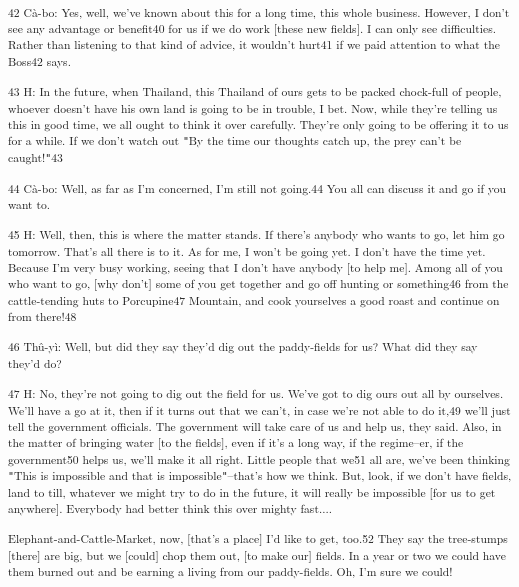 {\textsuperscript{42 Cà-bo: Yes, well, we've known about this for a long
time, this whole business. However, I don't see any advantage or benefit40 for
us if we do work [these new fields]. I can only see difficulties. Rather than listening
to that kind of advice, it wouldn't hurt41 if we paid attention to what the Boss42
says. }}

{\textsuperscript{43 H: In the future, when Thailand, this Thailand of ours
gets to be packed chock-full of people, whoever doesn't have his own land is going
to be in trouble, I bet. Now, while they're telling us this in good time, we all
ought to think it over carefully. They're only going to be offering it to us for
a while. If we don't watch out \texttt{"}By the time our thoughts catch up, the
prey can't be caught!\texttt{"}43}}

{\textsuperscript{44 Cà-bo: Well, as far as I'm concerned, I'm still not
going.44 You all can discuss it and go if you want to. }}

{\textsuperscript{45 H: Well, then, this is where the matter stands. If
there's anybody who wants to go, let him go tomorrow. That's all there is to it.
As for me, I won't be going yet. I don't have the time yet. Because I'm very busy
working, seeing that I don't have anybody [to help me]. Among all of you who want
to go, [why don't] some of you get together and go off hunting or something46 from
the cattle-tending huts to Porcupine47 Mountain, and cook yourselves a good roast
and continue on from there!48}}

{\textsuperscript{46 Thû-yì: Well, but did they say they'd dig out the
paddy-fields for us? What did they say they'd do? }}

{\textsuperscript{47 H: No, they're not going to dig out the field for us.
We've got to dig ours out all by ourselves. We'll have a go at it, then if it turns
out that we can't, in case we're not able to do it,49 we'll just tell the government
officials. The government will take care of us and help us, they said. Also, in
the matter of bringing water [to the fields], even if it's a long way, if the regime--er,
if the government50 helps us, we'll make it all right. Little people that we51
all are, we've been thinking \texttt{"}This is impossible and that is impossible\texttt{"}--that's
how we think. But, look, if we don't have fields, land to till, whatever we might
try to do in the future, it will really be impossible [for us to get anywhere].
Everybody had better think this over mighty fast.... }}

{\textsuperscript{Elephant-and-Cattle-Market, now, [that's a place] I'd
like to get, too.52 They say the tree-stumps [there] are big, but we [could] chop
them out, [to make our] fields. In a year or two we could have them burned out
and be earning a living from our paddy-fields. Oh, I'm sure we could!}}

